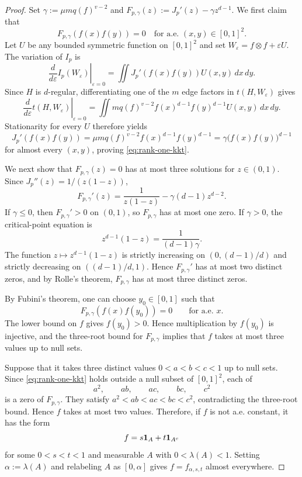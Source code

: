 \begin{proof}
Set $\gamma:=\mu m q(f)^{v-2}$ and $F_{p,\gamma}(z):=J_p'(z)-\gamma z^{d-1}$.
We first claim that
\begin{equation}
\label{eq:rank-one-kkt}
  F_{p,\gamma}(f(x)f(y))=0
  \quad\text{for a.e. }(x,y)\in[0,1]^2.
\end{equation}
Let $U$ be any bounded symmetric function on $[0,1]^2$ and set
$W_\varepsilon=f\otimes f+\varepsilon U$.  The variation of $I_p$ is
\[
  \left.\frac{d}{d\varepsilon}I_p(W_\varepsilon)\right|_{\varepsilon=0}
  =\iint J_p'(f(x)f(y))U(x,y)\,dx\,dy.
\]
Since $H$ is $d$-regular, differentiating one of the $m$ edge factors in
$t(H,W_\varepsilon)$ gives
\[
  \left.\frac{d}{d\varepsilon}t(H,W_\varepsilon)\right|_{\varepsilon=0}
  =\iint m q(f)^{v-2}f(x)^{d-1}f(y)^{d-1}
  U(x,y)\,dx\,dy.
\]
Stationarity for every $U$ therefore yields
\[
  J_p'(f(x)f(y))
  =\mu m q(f)^{v-2}f(x)^{d-1}f(y)^{d-1}
  =\gamma\bigl(f(x)f(y)\bigr)^{d-1}
\]
for almost every $(x,y)$, proving
\eqref{eq:rank-one-kkt}.

We next show that $F_{p,\gamma}(z)=0$ has at most three
solutions for $z\in(0,1)$.  Since $J_p''(z)=1/(z(1-z))$,
\[
  F_{p,\gamma}'(z)
  =\frac1{z(1-z)}-\gamma(d-1)z^{d-2}.
\]
If $\gamma\le0$, then $F_{p,\gamma}'>0$ on $(0,1)$, so
$F_{p,\gamma}$ has at most one zero.  If $\gamma>0$, the critical-point
equation is
\[
  z^{d-1}(1-z)=\frac1{(d-1)\gamma}.
\]
The function $z\mapsto z^{d-1}(1-z)$ is strictly increasing on
$(0,(d-1)/d)$ and strictly decreasing on $((d-1)/d,1)$.  Hence
$F_{p,\gamma}'$ has at most two distinct zeros,
and by Rolle's theorem, $F_{p,\gamma}$ has at most three distinct zeros.

By Fubini's theorem, one can choose $y_0\in[0,1]$ such that
\[
  F_{p,\gamma}(f(x)f(y_0))=0
  \qquad\text{for a.e. }x.
\]
The lower bound on $f$ gives $f(y_0)>0$.  Hence multiplication by
$f(y_0)$ is injective, and the three-root bound for $F_{p,\gamma}$ implies
that $f$ takes at most three values up to null sets.

Suppose that it takes three distinct values $0<a<b<c<1$ up to null sets.
Since \eqref{eq:rank-one-kkt} holds outside a null subset
of $[0,1]^2$, each of
\[
  a^2,\qquad ab,\qquad ac,\qquad bc,\qquad c^2
\]
is a zero of $F_{p,\gamma}$.  They satisfy
$a^2<ab<ac<bc<c^2$, contradicting the three-root bound.  Hence $f$ takes at
most two values.
Therefore, if $f$ is not a.e. constant, it has the form
\[
  f=s\mathbf 1_A+t\mathbf 1_{A^c}
\]
for some $0<s<t<1$ and measurable $A$ with $0<\lambda(A)<1$.  Setting
$\alpha:=\lambda(A)$ and relabeling $A$ as $[0,\alpha]$ gives
$f=f_{\alpha,s,t}$ almost everywhere.
\end{proof}

